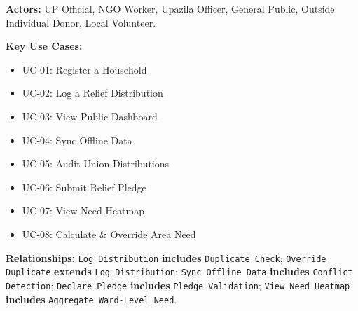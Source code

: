 \textbf{Actors:} UP Official, NGO Worker, Upazila Officer, General Public, Outside Individual Donor, Local Volunteer.

\textbf{Key Use Cases:}
\begin{itemize}[nosep]
    \item UC-01: Register a Household
    \item UC-02: Log a Relief Distribution
    \item UC-03: View Public Dashboard
    \item UC-04: Sync Offline Data
    \item UC-05: Audit Union Distributions
    \item UC-06: Submit Relief Pledge
    \item UC-07: View Need Heatmap
    \item UC-08: Calculate \& Override Area Need
\end{itemize}

\textbf{Relationships:} \texttt{Log Distribution} \textbf{includes} \texttt{Duplicate Check}; \texttt{Override Duplicate} \textbf{extends} \texttt{Log Distribution}; \texttt{Sync Offline Data} \textbf{includes} \texttt{Conflict Detection}; \texttt{Declare Pledge} \textbf{includes} \texttt{Pledge Validation}; \texttt{View Need Heatmap} \textbf{includes} \texttt{Aggregate Ward-Level Need}.

